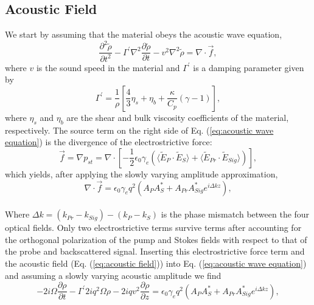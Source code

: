 \documentclass[sn-nature]{sn-jnl}%
\begin{document}
\subsection{Acoustic Field}
We start by assuming that the material obeys the acoustic wave equation,
\begin{equation}
    \frac{\partial^{2}\tilde{\rho}}{\partial t^{2}} - \Gamma^{\prime}\nabla^{2}\frac{\partial\tilde{\rho}}{\partial t} - v^{2}\nabla^{2}\tilde{\rho} = \nabla\cdot\vec{f},
    \label{eq:acoustic wave equation}
\end{equation}
\noindent where $v$ is the sound speed in the material and $\Gamma^{\prime}$ is a damping parameter given by
\begin{equation}
    \Gamma^{\prime} = \frac{1}{\rho}\left[\frac{4}{3}\eta_{s} + \eta_{b} + \frac{\kappa}{C_{p}}(\gamma - 1)\right],
\end{equation}
\noindent where $\eta_{s}$ and $\eta_{b}$ are the shear and bulk viscosity coefficients of the material, respectively. The source term on the right side of Eq. (\ref{eq:acoustic wave equation}) is the divergence of the electrostrictive force:
\begin{equation}
    \vec{f} = \nabla p_{st} = \nabla \cdot \left[-\frac{1}{2}\epsilon_{0}\gamma_{e}\left(\langle\tilde{E}_{P} \cdot \tilde{E}_{S}\rangle + \langle\tilde{E}_{Pr} \cdot \tilde{E}_{Sig}\rangle\right)\right],
\end{equation}
which yields, after applying the slowly varying amplitude approximation,
\begin{equation}
    \nabla\cdot\vec{f} = \epsilon_{0}\gamma_{e}q^{2}(A_{P}A_{S}^{*} + A_{Pr}A_{Sig}^{*}e^{i\Delta kz}),
\end{equation}
\\
Where $\Delta k = (k_{Pr} - k_{Sig}) - (k_{P} - k_{S})$ is the phase mismatch between the four optical fields. Only two electrostrictive terms survive terms after accounting for the orthogonal polarization of the pump and Stokes fields with respect to that of the probe and backscattered signal. Inserting this electrostrictive force term and the acoustic field (Eq. (\ref{eq:acoustic field})) into Eq. (\ref{eq:acoustic wave equation}) and assuming a slowly varying acoustic amplitude we find
\begin{equation}
    -2i\Omega\frac{\partial\rho}{\partial t} - \Gamma^{\prime}2iq^{2}\Omega\rho - 2iqv^{2}\frac{\partial\rho}{\partial z} = \epsilon_{0}\gamma_{e}q^{2}(A_{P}A_{S}^{*} + A_{Pr}A_{Sig}^{*}e^{i\Delta kz}),
\end{equation}
\end{document}

